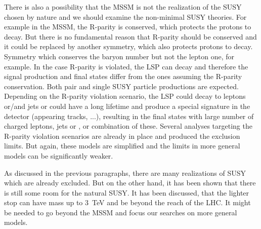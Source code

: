 There is also a possibility that the MSSM is not the realization of the SUSY chosen by nature and we should examine the non-minimal SUSY theories. For example in the MSSM, the R-parity is conserved, which protects the protons to decay. But there is no fundamental reason that R-parity should be conserved and it could be replaced by another symmetry, which also protects protons to decay. Symmetry which conserves the baryon number but not the lepton one, for example. In the case R-parity is violated, the LSP can decay and therefore the signal production and final states differ from the ones assuming the R-parity conservation. Both pair and single SUSY particle productions are expected. Depending on the R-parity violation scenario, the LSP could decay to leptons or/and jets or could have a long lifetime and produce a special signature in the detector (appearing tracks, ...), resulting in the final states with large number of charged leptons, jets or \MET, or combination of these. Several analyses targeting the R-parity violation scenarios are already in place and produced the exclusion limits. But again, these models are simplified and the limits in more general models can be significantly weaker.

As discussed in the previous paragraphs, there are many realizations of SUSY which are already excluded. But on the other hand, it has been shown that there is still some room for the natural SUSY. It has been discussed, that the lighter stop can have mass up to 3~TeV and be beyond the reach of the LHC. It might be needed to go beyond the MSSM and focus our searches on more general models.

